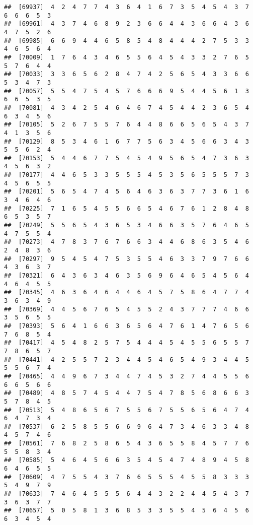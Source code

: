 \documentclass[
]{book}
\begin{document}
\begin{verbatim}
##  [69937]  4  2  4  7  7  4  3  6  4  1  6  7  3  5  4  5  4  3  7  6  6  6  5  3
##  [69961]  4  3  7  4  6  8  9  2  3  6  6  4  4  3  6  6  4  3  6  4  7  5  2  6
##  [69985]  6  6  9  4  4  6  5  8  5  4  8  4  4  4  2  7  5  3  3  4  6  5  6  4
##  [70009]  1  7  6  4  3  4  6  5  5  6  4  5  4  3  3  2  7  6  5  5  7  6  4  4
##  [70033]  3  3  6  5  6  2  8  4  7  4  2  5  6  5  4  3  3  6  6  5  3  4  7  3
##  [70057]  5  5  4  7  5  4  5  7  6  6  6  9  5  4  4  5  6  1  3  6  6  5  3  5
##  [70081]  4  3  4  2  5  4  6  4  6  7  4  5  4  4  2  3  6  5  4  6  3  4  5  6
##  [70105]  5  2  6  7  5  5  7  6  4  4  8  6  6  5  6  5  4  3  7  4  1  3  5  6
##  [70129]  8  5  3  4  6  1  6  7  7  5  6  3  4  5  6  6  3  4  3  5  5  6  2  4
##  [70153]  5  4  4  6  7  7  5  4  5  4  9  5  6  5  4  7  3  6  3  4  5  6  3  2
##  [70177]  4  4  6  5  3  3  5  5  5  4  5  3  5  6  5  5  5  7  3  4  5  6  5  5
##  [70201]  5  6  5  4  7  4  5  6  4  6  3  6  3  7  7  3  6  1  6  3  4  6  4  6
##  [70225]  7  1  6  5  4  5  5  6  6  5  4  6  7  6  1  2  8  4  8  6  5  3  5  7
##  [70249]  5  5  6  5  4  3  6  5  3  4  6  6  3  5  7  6  4  6  5  4  7  5  5  4
##  [70273]  4  7  8  3  7  6  7  6  6  3  4  4  6  8  6  3  5  4  6  2  4  8  3  6
##  [70297]  9  5  4  5  4  7  5  3  5  5  4  6  3  3  7  9  7  6  6  4  3  6  3  7
##  [70321]  6  4  3  6  3  4  6  3  5  6  9  6  4  6  5  4  5  6  4  4  6  4  5  5
##  [70345]  4  6  3  6  4  6  4  4  6  4  5  7  5  8  6  4  7  7  4  3  6  3  4  9
##  [70369]  4  4  5  6  7  6  5  4  5  5  2  4  3  7  7  7  4  6  6  3  5  6  5  5
##  [70393]  5  6  4  1  6  6  3  6  5  6  4  7  6  1  4  7  6  5  6  7  6  8  5  4
##  [70417]  4  5  4  8  2  5  7  5  4  4  4  5  4  5  5  6  5  5  7  7  8  6  5  7
##  [70441]  4  2  5  5  7  2  3  4  4  5  4  6  5  4  9  3  4  4  5  5  5  6  7  4
##  [70465]  4  4  9  6  7  3  4  4  7  4  5  3  2  7  4  4  5  5  6  6  6  5  6  6
##  [70489]  4  8  5  7  4  5  4  4  7  5  4  7  8  5  6  8  6  6  3  5  7  8  4  5
##  [70513]  5  4  8  6  5  6  7  5  5  6  7  5  5  6  5  6  4  7  4  6  4  7  3  4
##  [70537]  6  2  5  8  5  5  6  6  9  6  4  7  3  4  6  3  3  4  8  4  5  7  4  6
##  [70561]  7  6  8  2  5  8  6  5  4  3  6  5  5  8  4  5  7  7  6  5  5  8  3  4
##  [70585]  5  4  6  4  5  6  6  3  5  4  5  4  7  4  8  9  4  5  8  6  4  6  5  5
##  [70609]  4  7  5  5  4  3  7  6  6  5  5  5  4  5  5  8  3  3  3  5  4  9  7  9
##  [70633]  7  4  6  4  5  5  5  6  4  4  3  2  2  4  4  5  4  3  7  3  6  3  7  7
##  [70657]  5  0  5  8  1  3  6  8  5  3  3  5  5  4  5  6  4  5  6  6  3  4  5  4

\end{verbatim}
\end{document}
